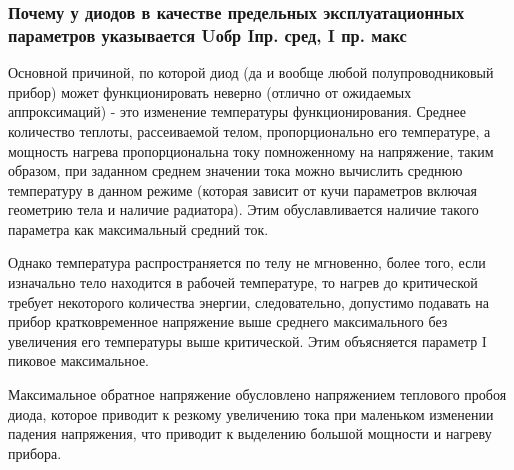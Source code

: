\subsubsection{Почему у диодов в качестве предельных эксплуатационных параметров указывается Uобр Iпр. сред, I пр. макс}

Основной причиной, по которой диод (да и вообще любой полупроводниковый прибор) может функционировать неверно (отлично от ожидаемых аппроксимаций) - это изменение температуры функционирования.
Среднее количество теплоты, рассеиваемой телом, пропорционально его температуре, а мощность нагрева пропорциональна току помноженному на напряжение, таким образом, при заданном среднем значении тока можно вычислить среднюю температуру в данном режиме (которая зависит от кучи параметров включая геометрию тела и наличие радиатора). Этим обуславливается наличие такого параметра как максимальный средний ток.


Однако температура распространяется по телу не мгновенно, более того, если изначально тело находится в рабочей температуре, то нагрев до критической требует некоторого количества энергии, следовательно, допустимо подавать на прибор кратковременное напряжение выше среднего максимального без увеличения его температуры выше критической. Этим объясняется параметр I пиковое максимальное.


Максимальное обратное напряжение обусловлено напряжением теплового пробоя диода, которое приводит к резкому увеличению тока при маленьком изменении падения напряжения, что приводит к выделению большой мощности и нагреву прибора.

